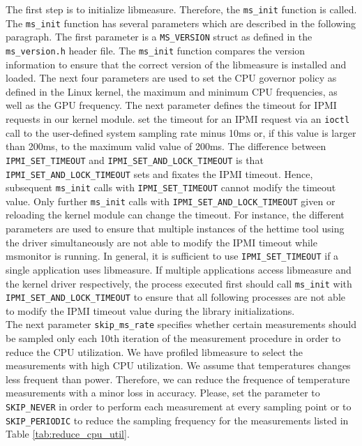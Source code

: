 The first step is to initialize libmeasure. Therefore, the \texttt{ms\_init} function is called. The \texttt{ms\_init} function has several parameters which are described in the following paragraph. The first parameter is a \texttt{MS\_VERSION} struct as defined in the \texttt{ms\_version.h} header file. The \texttt{ms\_init} function compares the version information to ensure that the correct version of the libmeasure is installed and loaded. The next four parameters are used to set the CPU governor policy as defined in the Linux kernel, the maximum and minimum CPU frequencies, as well as the GPU frequency. The next parameter defines the timeout for IPMI requests in our kernel module.  set the timeout for an IPMI request via an \texttt{ioctl} call to the user-defined system sampling rate minus 10ms or, if this value is larger than 200ms, to the maximum valid value of 200ms. The difference between \texttt{IPMI\_SET\_TIMEOUT} and  \texttt{IPMI\_SET\_AND\_LOCK\_TIMEOUT} is that \texttt{IPMI\_SET\_AND\_LOCK\_TIMEOUT} sets and fixates the IPMI timeout. Hence, subsequent \texttt{ms\_init} calls with \texttt{IPMI\_SET\_TIMEOUT} cannot modify the timeout value. Only further \texttt{ms\_init} calls with \texttt{IPMI\_SET\_AND\_LOCK\_TIMEOUT} given or reloading the kernel module can change the timeout. For instance, the different parameters are used to ensure that multiple instances of the hettime tool using the driver simultaneously are not able to modify the IPMI timeout while msmonitor is running. In general, it is sufficient to use \texttt{IPMI\_SET\_TIMEOUT} if a single application uses libmeasure. If multiple applications access libmeasure and the kernel driver respectively, the process executed first should call \texttt{ms\_init} with \texttt{IPMI\_SET\_AND\_LOCK\_TIMEOUT} to ensure that all following processes are not able to modify the IPMI timeout value during the library initializations.\\
The next parameter \texttt{skip\_ms\_rate} specifies whether certain measurements should be sampled only each 10th iteration of the measurement procedure in order to reduce the CPU utilization. We have profiled libmeasure to select the measurements with high CPU utilization. We assume that temperatures changes less frequent than power. Therefore, we can reduce the frequence of temperature measurements with a minor loss in accuracy. Please, set the parameter to \texttt{SKIP\_NEVER} in order to perform each measurement at every sampling point or to \texttt{SKIP\_PERIODIC} to reduce the sampling frequency for the measurements listed in Table \ref{tab:reduce_cpu_util}.

